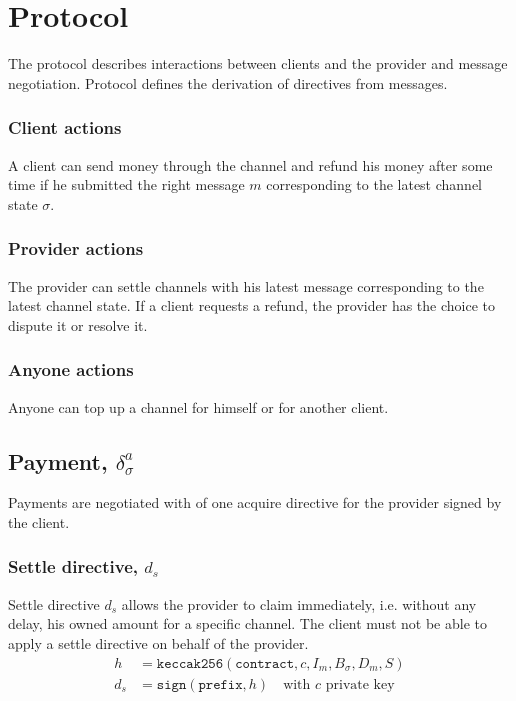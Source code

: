 \documentclass{llncs}
\begin{document}
\section{Protocol} The protocol describes interactions between clients and the provider and message negotiation. Protocol defines the derivation of directives from messages.

\subsubsection{Client actions} A client can send money through the channel and refund his money after some time if he submitted the right message $m$ corresponding to the latest channel state $\sigma$.

\subsubsection{Provider actions} The provider can settle channels with his latest message corresponding to the latest channel state. If a client requests a refund, the provider has the choice to dispute it or resolve it.

\subsubsection{Anyone actions} Anyone can top up a channel for himself or for another client.

\subsection{Payment, $\delta_\sigma^a$} Payments are negotiated with of one acquire directive for the provider signed by the client.

\subsubsection{Settle directive, $d_s$} Settle directive $d_s$ allows the provider to claim immediately, i.e. without any delay, his owned amount for a specific channel. The client must not be able to apply a settle directive on behalf of the provider.
\begin{equation*}
\begin{split}
    h &= \texttt{keccak256}(\texttt{contract},c,I_m,B_\sigma,D_m,S) \\
    d_s &= \texttt{sign}(\texttt{prefix}, h) \quad \text{with $c$ private key} \\
\end{split}
\end{equation*}
\end{document}
